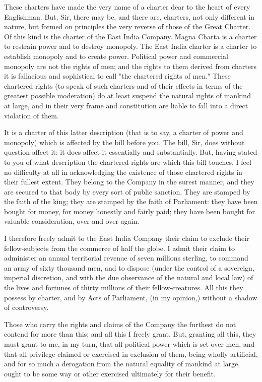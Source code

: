 These charters have made the very name of a charter dear to the heart of every Englishman. But, Sir, there may be, and there are, charters, not only different in nature, but formed on principles the very reverse of those of the Great Charter. Of this kind is the charter of the East India Company. Magna Charta is a charter to restrain power and to destroy monopoly. The East India charter is a charter to establish monopoly and to create power. Political power and commercial monopoly are not the rights of men; and the rights to them derived from charters it is fallacious and sophistical to call "the chartered rights of men." These chartered rights (to speak of such charters and of their effects in terms of the greatest possible moderation) do at least suspend the natural rights of mankind at large, and in their very frame and constitution are liable to fall into a direct violation of them.

It is a charter of this latter description (that is to say, a charter of power and monopoly) which is affected by the bill before you. The bill, Sir, does without question affect it: it does affect it essentially and substantially. But, having stated to you of what description the chartered rights are which this bill touches, I feel no difficulty at all in acknowledging the existence of those chartered rights in their fullest extent. They belong to the Company in the surest manner, and they are secured to that body by every sort of public sanction. They are stamped by the faith of the king; they are stamped by the faith of Parliament: they have been bought for money, for money honestly and fairly paid; they have been bought for valuable consideration, over and over again.

I therefore freely admit to the East India Company their claim to exclude their fellow-subjects from the commerce of half the globe. I admit their claim to administer an annual territorial revenue of seven millions sterling, to command an army of sixty thousand men, and to dispose (under the control of a sovereign, imperial discretion, and with the due observance of the natural and local law) of the lives and fortunes of thirty millions of their fellow-creatures. All this they possess by charter, and by Acts of Parliament, (in my opinion,) without a shadow of controversy.

Those who carry the rights and claims of the Company the furthest do not contend for more than this; and all this I freely grant. But, granting all this, they must grant to me, in my turn, that all political power which is set over men, and that all privilege claimed or exercised in exclusion of them, being wholly artificial, and for so much a derogation from the natural equality of mankind at large, ought to be some way or other exercised ultimately for their benefit.


